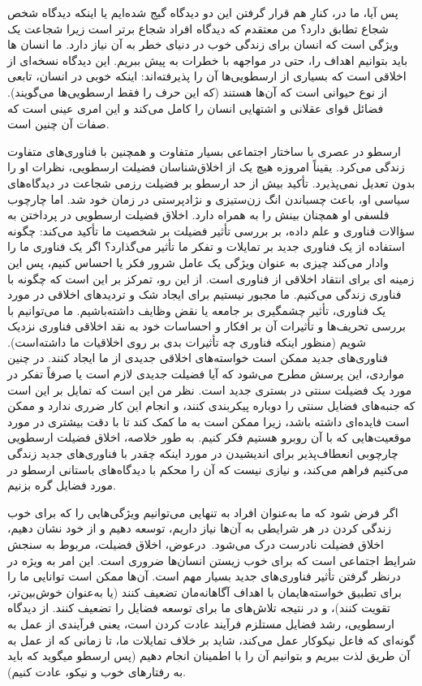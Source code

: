 پس آیا، ما در، کنارِ هم قرار گرفتن این دو دیدگاه گیج شده‌ایم یا اینکه دیدگاه شخص شجاع تطابق دارد؟ من معتقدم که دیدگاه افراد شجاع برتر است زیرا شجاعت یک ویژگی است که انسان برای زندگی خوب در دنیای خطر به آن نیاز دارد.
ما انسان ها باید بتوانیم اهداف را، حتی در مواجهه با خطرات به پیش ببریم.
این دیدگاه نسخه‌ای از اخلاقی است که بسیاری از ارسطویی‌ها آن را پذیرفته‌اند: اینکه خوبی در انسان، تابعی از نوع حیوانی است که آن‌ها هستند (که این حرف را فقط ارسطویی‌ها می‌گویند).
فضائل قوای عقلانی و اشتهایی انسان را کامل می‌کند و این امری عینی است که صفات آن چنین است.

ارسطو در عصری با ساختار اجتماعی بسیار متفاوت و همچنین با فناوری‌های متفاوت زندگی می‌کرد.
یقیناً امروزه هیچ یک از اخلاق‌شناسان فضیلت ارسطویی، نظرات او را بدون تعدیل نمی‌پذیرد.
تأکید بیش از حد ارسطو بر فضیلت رزمی شجاعت در دیدگاه‌های سیاسی او، باعث چسباندن انگ زن‌ستیزی و نژادپرستی در زمان خود شد.
اما چارچوب فلسفی او همچنان بینش را به همراه دارد.
اخلاق فضیلت ارسطویی در پرداختن به سؤالات فناوری و علم داده، بر بررسی تأثیر فضیلت بر شخصیت ما تأکید می‌کند: چگونه استفاده از یک فناوری جدید بر تمایلات و تفکر ما تأثیر می‌گذارد؟ اگر یک فناوری ما را وادار می‌کند چیزی به عنوان ویژگی یک عامل شرور فکر یا احساس کنیم، پس این زمینه ای برای انتقاد اخلاقی از فناوری است.
از این رو، تمرکز بر این است که چگونه با فناوری زندگی می‌کنیم.
ما مجبور نیستیم برای ایجاد شک و تردیدهای اخلاقی در مورد یک فناوری، تأثیر چشمگیری بر جامعه یا نقض وظایف داشته‌باشیم.
ما می‌توانیم با بررسی تحریف‌ها و تأثیرات آن بر افکار و احساسات خود به نقد اخلاقی فناوری نزدیک شویم (منظور اینکه فناوری چه تأثیرات بدی بر روی اخلاقیات ما داشته‌است).
فناوری‌های جدید ممکن است خواسته‌های اخلاقی جدیدی از ما ایجاد کنند.
در چنین مواردی، این پرسش مطرح می‌شود که آیا فضیلت جدیدی لازم است یا صرفاً تفکر در مورد یک فضیلت سنتی در بستری جدید است.
نظر من این است که تمایل بر این است که جنبه‌های فضایل سنتی را دوباره پیکربندی کنند، و انجام این کار ضرری ندارد و ممکن است فایده‌ای داشته باشد، زیرا ممکن است به ما کمک کند تا با دقت بیشتری در مورد موقعیت‌هایی که با آن روبرو هستیم فکر کنیم.
به طور خلاصه، اخلاق فضیلت ارسطویی چارچوبی انعطاف‌پذیر برای اندیشیدن در مورد اینکه چقدر با فناوری‌های جدید زندگی می‌کنیم فراهم می‌کند، و نیازی نیست که آن را محکم با دیدگاه‌های باستانی ارسطو در مورد فضایل گره بزنیم.

اگر فرض شود که ما به‌عنوان افراد به تنهایی می‌توانیم ویژگی‌هایی را که برای خوب زندگی کردن در هر شرایطی به آن‌ها نیاز داریم، توسعه دهیم و از خود نشان دهیم، اخلاق فضیلت نادرست درک می‌شود.\ درعوض، اخلاق فضیلت، مربوط به سنجش شرایط اجتماعی است که برای خوب زیستن انسان‌ها ضروری است.
این امر به ویژه در در‌نظر گرفتن تأثیر فناوری‌های جدید بسیار مهم است.
آن‌ها ممکن است توانایی ما را برای تطبیق خواسته‌هایمان با اهداف آگاهانه‌مان تضعیف کنند (یا به‌عنوان خوش‌بین‌تر، تقویت کنند)، و در نتیجه تلاش‌های ما برای توسعه فضایل را تضعیف کنند.
از دیدگاه ارسطویی، رشد فضایل مستلزم فرآیند عادت کردن است، یعنی فرآیندی از عمل به گونه‌ای که فاعل نیکوکار عمل می‌کند، شاید بر خلاف تمایلات ما، تا زمانی که از عمل به آن طریق لذت ببریم و بتوانیم آن را با اطمینان انجام دهیم (پس ارسطو میگوید که باید به رفتارهای خوب و نیکو، عادت کنیم).



